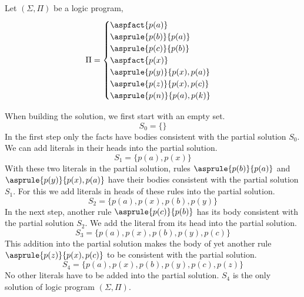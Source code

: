 \begin{example}\label{exp:long_program}
    Let $(\Sigma, \Pi)$ be a logic program,
    \begin{equation*}
        \Pi =
            \begin{cases}
                \aspfact{p(a)}\\
                \asprule{p(b)}{p(a)}\\
                \asprule{p(c)}{p(b)}\\
                \aspfact{p(x)}\\
                \asprule{p(y)}{p(x), p(a)}\\
                \asprule{p(z)}{p(x), p(c)}\\
                \asprule{p(n)}{p(a), p(k)}\\
            \end{cases}
    \end{equation*}

    When building the solution, we first start with an empty set.
    \begin{equation*}
        S_0 = \{\}
    \end{equation*}
    In the first step only the facts have bodies consistent with
    the partial solution $S_0$. We can add literals in their heads into
    the partial solution.
    \begin{equation*}
        S_1 = \{p(a), p(x)\}
    \end{equation*}
    With these two literals in the partial solution, rules $\asprule{p(b)}{p(a)}$
    and $\asprule{p(y)}{p(x), p(a)}$ have their bodies consistent
    with the partial solution $S_1$. For this we add literals in heads of these
    rules into the partial solution.
    \begin{equation*}
        S_2 = \{p(a), p(x), p(b), p(y)\}
    \end{equation*}
    In the next step, another rule $\asprule{p(c)}{p(b)}$ has its body consistent
    with the partial solution $S_2$. We add the literal from its head into
    the partial solution.
    \begin{equation*}
        S_3 = \{p(a), p(x), p(b), p(y), p(c)\}
    \end{equation*}
    This addition into the partial solution makes the body of yet another
    rule $\asprule{p(z)}{p(x), p(c)}$ to be consistent with the partial solution.
    \begin{equation*}
        S_4 = \{p(a), p(x), p(b), p(y), p(c), p(z)\}
    \end{equation*}
    No other literals have to be added into the partial solution.
    $S_4$ is the only solution of logic program $(\Sigma, \Pi)$.
\end{example}

